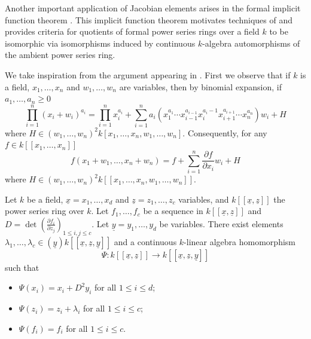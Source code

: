 \documentclass[12pt]{amsart}
\numberwithin{equation}{theorem}
\theoremstyle{plain}
\begin{document}
Another important application of Jacobian elements arises in the formal implicit function theorem \cite[Corollary on p.~A.IV.37]{BourbakiAlgebraII}. This implicit function theorem motivates techniques of \cite{Samuel1951Singularites,Samuel1956Algebricite,Hironaka1965Equivalence,CutkoskySrinivasan1993Intrinsic,CutkoskySrinivasan1997Equivalence} and provides criteria for quotients of formal power series rings over a field $k$ to be isomorphic via isomorphisms induced by continuous $k$-algebra automorphisms of the ambient power series ring.

We take inspiration from the argument appearing in \cite[]{CutkoskySrinivasan1993Intrinsic}. First we observe that if $k$ is a field, $x_1,\ldots,x_n$ and $w_1,\ldots,w_n$ are variables, then by binomial expansion, if $a_1,\ldots,a_n\geq 0$
\[
\prod_{i=1}^n(x_i+w_i)^{a_i} = \prod_{i=1}^nx_i^{a_i} + \sum_{i=1}^n a_i\left(x_1^{a_1}\cdots x_{i-1}^{a_{i-1}}x_i^{a_i-1}x_{i+1}^{a_{i+1}}\cdots x_n^{a_n}\right)w_i + H
\]
where $H\in (w_1,\ldots,w_n)^{2}k[x_1,\ldots,x_n,w_1,\ldots,w_n]$.  Consequently, for any $f\in k[[x_1,\ldots,x_n]]$
\[
f(x_1+w_1,\ldots,x_n+w_n) = f + \sum_{i=1}^n \frac{\partial f}{\partial x_i}w_i + H
\]
where $H\in (w_1,\ldots,w_n)^{2}k[[x_1,\ldots,x_n,w_1,\ldots,w_n]]$.



\begin{lemma}
    \label{lem: multivariable calculus lemma}
    Let $k$ be a field, $\underline{x} = x_1,\ldots,x_d$ and $\underline{z} = z_1,\ldots,z_c$ variables,  and $ k[[\underline{x},\underline{z}]]$ the power series ring over $k$. Let $f_1,\ldots,f_c$ be a sequence in $k[[\underline{x},\underline{z}]]$ and $D = \det(\frac{\partial f_i}{\partial z_{j}})_{1\leq i,j\leq c}$. Let $\underline{y} = y_1,\ldots,y_d$ be variables. There exist elements $\lambda_1,\ldots,\lambda_c\in \left(\underline{y}\right)k[[\underline{x},\underline{z},\underline{y}]]$ and a continuous $k$-linear algebra homomorphism 
    \[
    \Psi:k[[\underline{x},\underline{z}]]\to k[[\underline{x},\underline{z}, \underline{y}]]
    \]
    such that
    \begin{itemize}
        \item $\Psi(x_i) = x_i+D^2y_i$ for all $1\leq i\leq d$;
        \item $\Psi(z_i) = z_i + \lambda_i$ for all $1\leq i\leq c$;
        \item $\Psi(f_i) = f_i$ for all $1\leq i\leq c$.
    \end{itemize}
\end{lemma}
\end{document}
